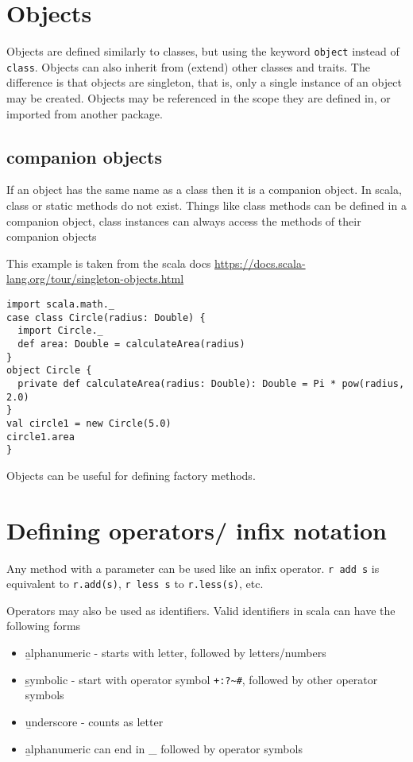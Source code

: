 \section{Objects}

Objects are defined similarly to classes, but using the keyword \lstinline{object} instead of \lstinline{class}. Objects can also inherit from (extend) other classes and traits. The difference is that objects are singleton, that is, only a single instance of an object may be created. Objects may be referenced in the scope they are defined in, or imported from another package.

\subsection{companion objects}
If an object has the same name as a class then it is a companion object. In scala, class or static methods do not exist. Things like class methods can be defined in a companion object, class instances can always access the methods of their companion objects

This example is taken from the scala docs \url{https://docs.scala-lang.org/tour/singleton-objects.html} 
\begin{lstlisting}
import scala.math._
case class Circle(radius: Double) {
  import Circle._
  def area: Double = calculateArea(radius)
}
object Circle {
  private def calculateArea(radius: Double): Double = Pi * pow(radius, 2.0)
}
val circle1 = new Circle(5.0)
circle1.area
}
\end{lstlisting}

Objects can be useful for defining factory methods.

\section{Defining operators/ infix notation}

Any method with a parameter can be used like an infix operator. \lstinline|r add s| is equivalent to \lstinline|r.add(s)|, \lstinline|r less s| to \lstinline|r.less(s)|, etc.

Operators may also be used as identifiers. Valid identifiers in scala can have the following forms
\begin{itemize}
  \item { \b alphanumeric } - starts with letter, followed by letters/numbers
  \item { \b symbolic } - start with operator symbol \lstinline|+:?~#|, followed by other operator symbols
  \item {\b underscore } - counts as letter
  \item {\b alphanumeric } can end in \_ followed by operator symbols
\end{itemize}

